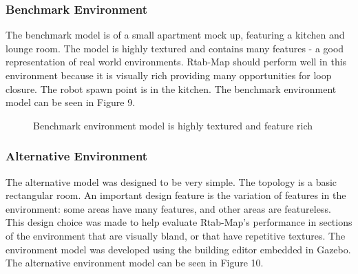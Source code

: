 \documentclass[a4paper]{article}
\begin{document}
\subsubsection{Benchmark Environment}
The benchmark model is of a small apartment mock up, featuring a kitchen and lounge room. The model is highly textured and contains many features - a good representation of real world environments. Rtab-Map should perform well in this environment because it is visually rich providing many opportunities for loop closure. The robot spawn point is in the kitchen. The benchmark environment model can be seen in Figure 9.

\begin{figure}[h]
\centering
{}
\caption{Benchmark environment model is highly textured and feature rich}
\end{figure}

\subsubsection{Alternative Environment}
The alternative model was designed to be very simple. The topology is a basic rectangular room. An important design feature is the variation of features in the environment: some areas have many features, and other areas are featureless. This design choice was made to help evaluate Rtab-Map's performance in sections of the environment that are visually bland, or that have repetitive textures. The environment model was developed using the building editor embedded in Gazebo. The alternative environment model can be seen in Figure 10.
\end{document}
